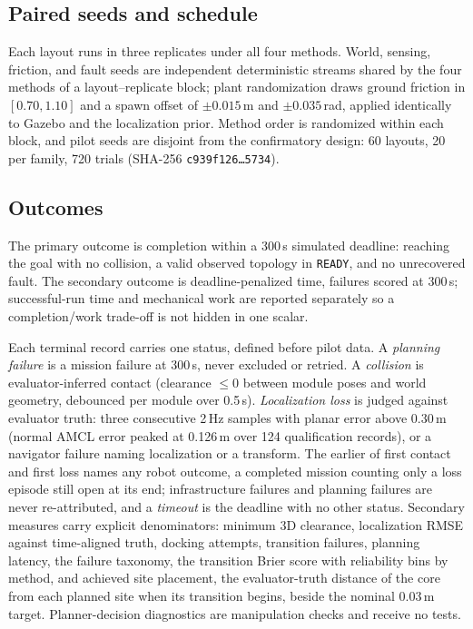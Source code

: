 \documentclass[conference]{IEEEtran}
\begin{document}
\subsection{Paired seeds and schedule}
Each layout runs in three replicates under all four methods. World, sensing, friction, and fault seeds are independent deterministic streams shared by the four methods of a layout--replicate block; plant randomization draws ground friction in $[0.70, 1.10]$ and a spawn offset of $\pm 0.015$\,m and $\pm 0.035$\,rad, applied identically to Gazebo and the localization prior. Method order is randomized within each block, and pilot seeds are disjoint from the confirmatory design: 60 layouts, 20 per family, 720 trials (SHA-256 \texttt{c939f126\ldots{}5734}).

\subsection{Outcomes}
The primary outcome is completion within a 300\,s simulated deadline: reaching the goal with no collision, a valid observed topology in \texttt{READY}, and no unrecovered fault. The secondary outcome is deadline-penalized time, failures scored at 300\,s; successful-run time and mechanical work are reported separately so a completion/work trade-off is not hidden in one scalar.

Each terminal record carries one status, defined before pilot data. A \emph{planning failure} is a mission failure at 300\,s, never excluded or retried. A \emph{collision} is evaluator-inferred contact (clearance $\le 0$ between module poses and world geometry, debounced per module over 0.5\,s). \emph{Localization loss} is judged against evaluator truth: three consecutive 2\,Hz samples with planar error above 0.30\,m (normal AMCL error peaked at 0.126\,m over 124 qualification records), or a navigator failure naming localization or a transform. The earlier of first contact and first loss names any robot outcome, a completed mission counting only a loss episode still open at its end; infrastructure failures and planning failures are never re-attributed, and a \emph{timeout} is the deadline with no other status.
Secondary measures carry explicit denominators: minimum 3D clearance, localization RMSE against time-aligned truth, docking attempts, transition failures, planning latency, the failure taxonomy, the transition Brier score with reliability bins by method, and achieved site placement, the evaluator-truth distance of the core from each planned site when its transition begins, beside the nominal 0.03\,m target. Planner-decision diagnostics are manipulation checks and receive no tests.
\end{document}
